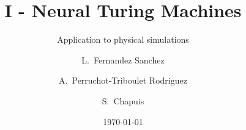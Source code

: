 \documentclass{beamer}
\title{I - Neural Turing Machines}
\subtitle{Application to physical simulations}
\author[Lucia Fernandez Sanchez, Alexandra Perruchot-Triboulet Rodriguez, Samuel Chapuis]{L.~Fernandez Sanchez \and A.~Perruchot-Triboulet Rodriguez \and S.~Chapuis}
\date{\today}
\begin{document}
\frame{\titlepage}
















    

   
        

    


    
\end{document}
